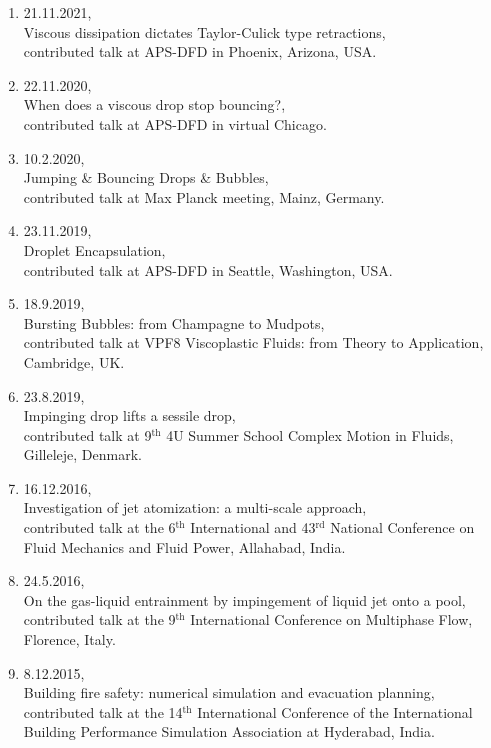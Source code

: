 \documentclass[11pt,a4paper,roman,english,colorlinks,linkcolor={red!50!black}]{moderncv}
\begin{document}
\begin{enumerate}[leftmargin=0.75cm]
	\item 21.11.2021,\\
	Viscous dissipation dictates Taylor-Culick type retractions,\\
	contributed talk at APS-DFD in Phoenix, Arizona, USA.

	\item 22.11.2020,\\
	When does a viscous drop stop bouncing?,\\
	contributed talk at APS-DFD in virtual Chicago.

	\item 10.2.2020,\\
	Jumping \& Bouncing Drops \& Bubbles,\\
	contributed talk at Max Planck meeting, Mainz, Germany.

	\item 23.11.2019,\\
	Droplet Encapsulation,\\
	contributed talk at APS-DFD in Seattle, Washington, USA.

	\item 18.9.2019,\\
	Bursting Bubbles: from Champagne to Mudpots,\\
	contributed talk at VPF8 Viscoplastic Fluids: from Theory to Application, Cambridge, UK.

	\item 23.8.2019,\\
	Impinging drop lifts a sessile drop,\\
	contributed talk at 9$^\text{th}$ 4U Summer School Complex Motion in Fluids, Gilleleje, Denmark.

	
	\item 16.12.2016,\\
	Investigation of jet atomization: a multi-scale approach,\\
	contributed talk at the 6$^\text{th}$ International and 43$^\text{rd}$ National Conference on Fluid Mechanics and Fluid Power, Allahabad, India.

	\item 24.5.2016,\\
	On the gas-liquid entrainment by impingement of liquid jet onto a pool,\\
	contributed talk at the 9$^\text{th}$ International Conference on Multiphase Flow, Florence, Italy.

	\item 8.12.2015,\\
	Building fire safety: numerical simulation and evacuation planning,\\
	contributed talk at the 14$^\text{th}$ International Conference of the International Building Performance Simulation Association at Hyderabad, India.
\end{enumerate}
\end{document}

